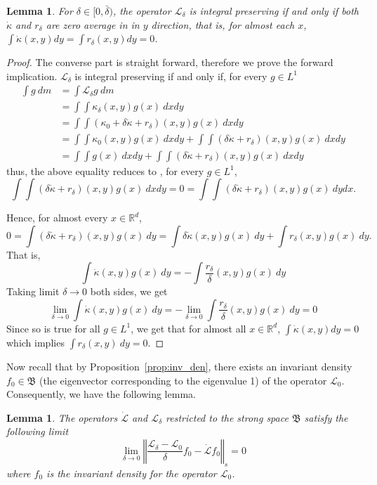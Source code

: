 \documentclass{amsart}
\newtheorem{lemma}[theorem]{Lemma}
\newcommand\cL{{\mathcal L}}
\newcommand\bR{{\mathbb R}}
\newcommand\fB{{\mathfrak B}}
\newcommand{\norm}[1]{\left\Vert#1\right\Vert}
\begin{document}
\begin{lemma}\label{lem:int_pr}
    For \(\delta\in[0,\bar\delta)\), the operator \(\cL_\delta\) is integral preserving if and only if both \(\dot \kappa\) and \(r_\delta\) are zero average in in \(y\) direction, that is, for almost each $x$, \(\int \dot \kappa(x,y)dy= \int r_\delta(x,y)dy=0\).

    
\end{lemma}
\begin{proof} The converse part is straight forward, therefore we prove the forward implication.
    \(\cL_\delta\) is integral preserving if and only if, for every \(g\in L^1\)
    \begin{align*}
          \int g\ dm &= \int \cL_\delta g\ dm  \\
  & = \int \int \kappa_\delta(x,y)g(x)\ dx dy \\
  & = \int\int (\kappa_0+\delta\dot \kappa+r_\delta)(x,y) g(x)\ dxdy \\
  & = \int\int \kappa_0(x,y) g(x)\ dxdy + \int\int (\delta\dot \kappa+r_\delta)(x,y) g(x)\ dxdy\\
  & = \int\int g(x)\ dxdy + \int\int (\delta\dot \kappa+r_\delta)(x,y) g(x)\ dxdy
  \end{align*}
   thus, the above equality reduces to , for every \(g\in L^1\), 
   \[
   \int \int (\delta\dot \kappa+r_\delta)(x,y)g(x)\ dx dy = 0 = \int \int (\delta\dot \kappa+r_\delta)(x,y)g(x)\ dy dx.
   \]

Hence, for almost every \(x\in\bR^d\), 
\[0= \int (\delta\dot \kappa+r_\delta)(x,y)g(x)\ dy = \int \delta\dot \kappa(x,y)g(x)\ dy + \int r_\delta(x,y)g(x)\ dy.\]
   That is, 
   \[\int \dot \kappa(x,y)g(x)\ dy = -\int\frac{r_\delta}{\delta}(x,y)g(x)\ dy\]
   Taking limit \(\delta\to 0\) both sides, we get 
   \[
   \lim\limits_{\delta\to 0}\int\dot \kappa(x,y)g(x) \ dy=-\lim\limits_{\delta\to 0}\int\frac{r_\delta}{\delta}(x,y)g(x) \ dy =0
   \]
   Since so is true for all \(g\in L^1\), we get that for almost all \(x\in\bR^d\), \(\int\dot \kappa(x,y)dy=0\) which implies \(\int r_\delta(x,y)\ dy=0\).

\end{proof}

Now recall that by Proposition~\ref{prop:inv_den}, there exists an invariant density \(f_0\in\fB\) (the eigenvector corresponding to the eigenvalue 1) of the operator \(\cL_0\). Consequently, we have the following lemma.
\begin{lemma}\label{ldot2} 
The operators \(\dot \cL\) and \(\cL_\delta\) restricted to the strong space \(\fB\) satisfy the following limit
\begin{equation*}
\lim_{\delta \rightarrow 0}\norm{\frac{\cL_{\delta }-\cL_{0}}{\delta }f_{0}-%
\dot{\cL}f_{0}}_{s}=0
\end{equation*}
where \(f_0\) is the invariant density for the operator \(\cL_0\).
\end{lemma}
\end{document}
